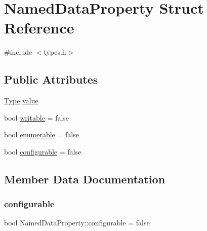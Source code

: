 \hypertarget{struct_named_data_property}{}\section{Named\+Data\+Property Struct Reference}
\label{struct_named_data_property}


{\ttfamily \#include $<$types.\+h$>$}

\subsection*{Public Attributes}
\begin{DoxyCompactItemize}
\item 
\hyperlink{types_8h_a053fb7bc318c12b089c5fe3ead06639d}{Type} \hyperlink{struct_named_data_property_a24c2a352d9e584c219ee0f9f6aaeb34e}{value}
\item 
bool \hyperlink{struct_named_data_property_a83f0bc6d87115a6c14f4644eac90c3e7}{writable} = false
\item 
bool \hyperlink{struct_named_data_property_adc471862166c903c652bd46b439f094e}{enumerable} = false
\item 
bool \hyperlink{struct_named_data_property_aeb6547dc7d587a6c93d3c65baf3c6307}{configurable} = false
\end{DoxyCompactItemize}


\subsection{Member Data Documentation}
\mbox{\label{struct_named_data_property_aeb6547dc7d587a6c93d3c65baf3c6307}} 
\subsubsection{\texorpdfstring{configurable}{configurable}}
{\footnotesize\ttfamily bool Named\+Data\+Property\+::configurable = false}

\mbox{\label{struct_named_data_property_adc471862166c903c652bd46b439f094e}} 
